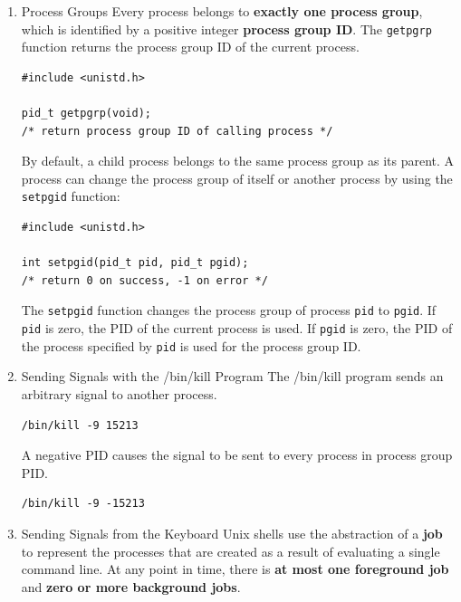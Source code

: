\documentclass[11pt]{article}
\begin{document}
\begin{enumerate}
\item Process Groups
\label{sec:org8eb9338}
Every process belongs to \textbf{exactly one process group}, which is identified by a positive integer \textbf{process group ID}. The \texttt{getpgrp} function returns the process group ID of the current process.\\

\begin{verbatim}
#include <unistd.h>

pid_t getpgrp(void);
/* return process group ID of calling process */
\end{verbatim}

By default, a child process belongs to the same process group as its parent. A process can change the process group of itself or another process by using the \texttt{setpgid} function:\\
\begin{verbatim}
#include <unistd.h>

int setpgid(pid_t pid, pid_t pgid);
/* return 0 on success, -1 on error */
\end{verbatim}
The \texttt{setpgid} function changes the process group of process \texttt{pid} to \texttt{pgid}. If \texttt{pid} is zero, the PID of the current process is used. If \texttt{pgid} is zero, the PID of the process specified by \texttt{pid} is used for the process group ID.\\


\item Sending Signals with the /bin/kill Program
\label{sec:org801221e}
The /bin/kill program sends an arbitrary signal to another process.\\
\begin{verbatim}
/bin/kill -9 15213
\end{verbatim}

A negative PID causes the signal to be sent to every process in process group PID.\\
\begin{verbatim}
/bin/kill -9 -15213
\end{verbatim}

\item Sending Signals from the Keyboard
\label{sec:org4753876}
Unix shells use the abstraction of a \textbf{job} to represent the processes that are created as a result of evaluating a single command line. At any point in time, there is \textbf{at most one foreground job} and \textbf{zero or more background jobs}.\\


\end{enumerate}
\end{document}
